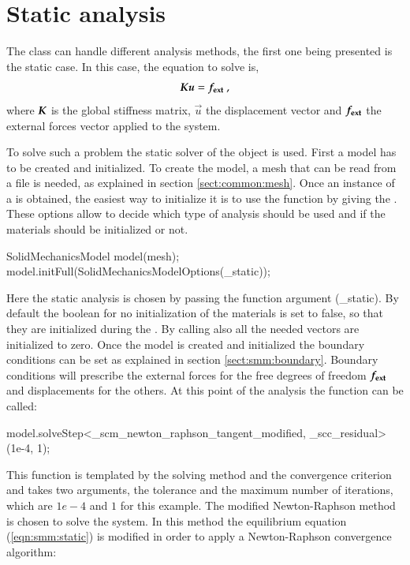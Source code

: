\section{Static analysis\label{sect:smm:static}}

The  class can handle different analysis
methods, the first one being presented is the static case.  In this
case, the equation to solve is,
\begin{equation}\label{eqn:smm:static} \boldsymbol{K} \boldsymbol{u} =
\boldsymbol{f_{{\mathrm{ext}}}}~,
\end{equation} where $\boldsymbol{K}$ is the global stiffness matrix,
$\vec{u}$ the displacement vector and $\boldsymbol{f_{{\mathrm{ext}}}}$ the
external forces vector applied to the system.


To solve such a problem the static solver of the
 object is used.
First a model has to be created and initialized.  To create the model,
a mesh that can be read from a file is needed, as explained in section
\ref{sect:common:mesh}.  Once an instance of a
 is obtained, the easiest way to initialize
it is to use the 
function by giving the . These
options allow to decide which type of analysis should be used and if
the materials should be initialized or not.
\begin{cpp} SolidMechanicsModel model(mesh);
model.initFull(SolidMechanicsModelOptions(_static));
\end{cpp} Here the static analysis is chosen by passing the function
argument (\_static). By default the boolean for no initialization of
the materials is set to false, so that they are initialized during the
. By calling  also all the needed
vectors are initialized to zero.  Once the model is created and
initialized the boundary conditions can be set as explained in section
\ref{sect:smm:boundary}.  Boundary conditions will prescribe the
external forces for the free degrees of freedom $\boldsymbol{f_{{\mathrm{ext}}}}$
and displacements for the others.  At this point of the analysis the
function  can be
called:
\begin{cpp} model.solveStep<_scm_newton_raphson_tangent_modified,
_scc_residual>(1e-4, 1);
\end{cpp} This function is templated by the solving method and the
convergence criterion and takes two arguments, the tolerance and the
maximum number of iterations, which are $1e-4$ and $1$ for this
example. The modified Newton-Raphson method is chosen to solve the
system. In this method the equilibrium equation (\ref{eqn:smm:static})
is modified in order to apply a Newton-Raphson convergence algorithm:

